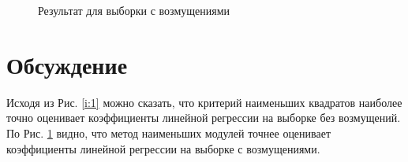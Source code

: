 \documentclass{article}
\begin{document}
\begin{figure}[h]
\caption{Результат для выборки с возмущениями}
\label{i:2}
\end{figure}

\newpage
\section{Обсуждение}

Исходя из Рис. \ref{i:1} можно сказать, что критерий наименьших квадратов наиболее точно оценивает коэффициенты линейной регрессии на выборке без возмущений. По Рис. \ref{i:2} видно, что метод наименьших модулей точнее оценивает коэффициенты линейной регрессии на выборке с возмущениями.
\end{document}
